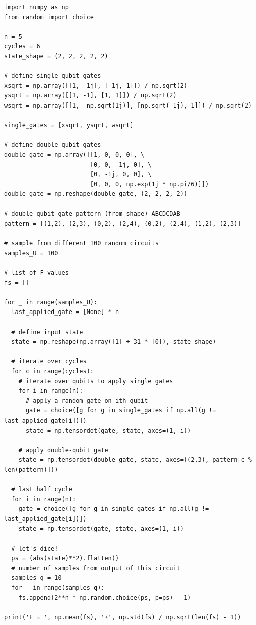 \documentclass[11pt]{article}
\begin{document}
\begin{latin}
\begin{lstlisting}
import numpy as np
from random import choice

n = 5
cycles = 6
state_shape = (2, 2, 2, 2, 2)

# define single-qubit gates
xsqrt = np.array([[1, -1j], [-1j, 1]]) / np.sqrt(2)
ysqrt = np.array([[1, -1], [1, 1]]) / np.sqrt(2)
wsqrt = np.array([[1, -np.sqrt(1j)], [np.sqrt(-1j), 1]]) / np.sqrt(2)

single_gates = [xsqrt, ysqrt, wsqrt]

# define double-qubit gates
double_gate = np.array([[1, 0, 0, 0], \
                        [0, 0, -1j, 0], \
                        [0, -1j, 0, 0], \
                        [0, 0, 0, np.exp(1j * np.pi/6)]])
double_gate = np.reshape(double_gate, (2, 2, 2, 2))

# double-qubit gate pattern (from shape) ABCDCDAB
pattern = [(1,2), (2,3), (0,2), (2,4), (0,2), (2,4), (1,2), (2,3)]

# sample from different 100 random circuits
samples_U = 100

# list of F values
fs = []

for _ in range(samples_U):
  last_applied_gate = [None] * n

  # define input state
  state = np.reshape(np.array([1] + 31 * [0]), state_shape)

  # iterate over cycles
  for c in range(cycles):
    # iterate over qubits to apply single gates 
    for i in range(n):
      # apply a random gate on ith qubit
      gate = choice([g for g in single_gates if np.all(g != last_applied_gate[i])])
      state = np.tensordot(gate, state, axes=(1, i))
      
    # apply double-qubit gate
    state = np.tensordot(double_gate, state, axes=((2,3), pattern[c % len(pattern)]))
    
  # last half cycle
  for i in range(n):
    gate = choice([g for g in single_gates if np.all(g != last_applied_gate[i])])
    state = np.tensordot(gate, state, axes=(1, i))
    
  # let's dice!
  ps = (abs(state)**2).flatten()
  # number of samples from output of this circuit
  samples_q = 10
  for _ in range(samples_q):
    fs.append(2**n * np.random.choice(ps, p=ps) - 1)
  
print('F = ', np.mean(fs), '±', np.std(fs) / np.sqrt(len(fs) - 1))
\end{lstlisting}
\end{latin}
\end{document}
